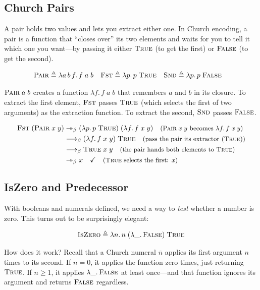\documentclass[11pt,a4paper]{article}
\theoremstyle{definition}
\newcommand{\lam}{\lambda}
\newcommand{\reduce}{\longrightarrow_\beta}
\newcommand{\reduces}{\twoheadrightarrow_\beta}
\newcommand{\church}[1]{\overline{#1}}
\newcommand{\TR}{\textsc{True}}
\newcommand{\FL}{\textsc{False}}
\newcommand{\rmark}[1]{\quad\text{\small(#1)}}
\begin{document}
\subsection{Church Pairs}

A pair holds two values and lets you extract either one. In Church encoding, a
pair is a function that ``closes over'' its two elements and waits for you to
tell it which one you want---by passing it either $\TR$ (to get the first) or
$\FL$ (to get the second).

\begin{align*}
\textsc{Pair} &\triangleq \lam a\, b\, f.\, f\; a\; b &
\textsc{Fst} &\triangleq \lam p.\, p\; \TR &
\textsc{Snd} &\triangleq \lam p.\, p\; \FL
\end{align*}

$\textsc{Pair}\;a\;b$ creates a function $\lam f.\, f\;a\;b$ that remembers
$a$ and $b$ in its closure. To extract the first element, $\textsc{Fst}$ passes
$\TR$ (which selects the first of two arguments) as the extraction function. To
extract the second, $\textsc{Snd}$ passes $\FL$.

\begin{workedexample}[$\textsc{Fst}\;(\textsc{Pair}\;x\;y) = x$]
\begin{align*}
  \textsc{Fst}\;(\textsc{Pair}\;x\;y)
  &\reduces (\lam p.\, p\;\TR)\;(\lam f.\, f\;x\;y)
    \rmark{$\textsc{Pair}\;x\;y$ becomes $\lam f.\, f\;x\;y$} \\
  &\reduce (\lam f.\, f\;x\;y)\;\TR
    \rmark{pass the pair its extractor ($\TR$)} \\
  &\reduce \TR\;x\;y
    \rmark{the pair hands both elements to $\TR$} \\
  &\reduces x \quad\checkmark
    \rmark{$\TR$ selects the first: $x$}
\end{align*}
\end{workedexample}

\subsection{IsZero and Predecessor}\label{sec:pred}

With booleans and numerals defined, we need a way to \emph{test} whether a
number is zero. This turns out to be surprisingly elegant:

\[
\textsc{IsZero} \triangleq \lam n.\, n\; (\lam \_.\, \FL)\; \TR
\]

How does it work? Recall that a Church numeral $\church{n}$ applies its first
argument $n$ times to its second. If $n = 0$, it applies the function zero
times, just returning $\TR$. If $n \geq 1$, it applies $\lam\_.\,\FL$ at least
once---and that function ignores its argument and returns $\FL$ regardless.
\end{document}
